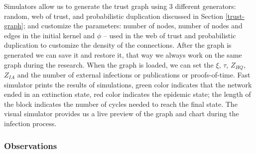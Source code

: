\documentclass[nostrict]{szablonPG}
\begin{document}
Simulators allow us to generate the trust graph using 3 different generators: random, web of trust, and probabilistic duplication discussed in Section \ref{trust-graph}; and customize the parameters: number of nodes, number of nodes and edges in the initial kernel and $\phi$ -- used in the web of trust and probabilistic duplication to customize the density of the connections. After the graph is generated we can save it and restore it, that way we always work on the same graph during the research. 
When the graph is loaded, we can set the $\xi$, $\tau$, $Z_{HQ}$, $Z_{IA}$ and the number of external infections or publications or proofs-of-time.
Fast simulator prints the results of simulations, green color indicates that the network ended in an extinction state, red color indicates the epidemic state; the length of the block indicates the number of cycles needed to reach the final state. The visual simulator provides us a live preview of the graph and chart during the infection process.  


\subsubsection{Observations}
\label{observations}
\end{document}
